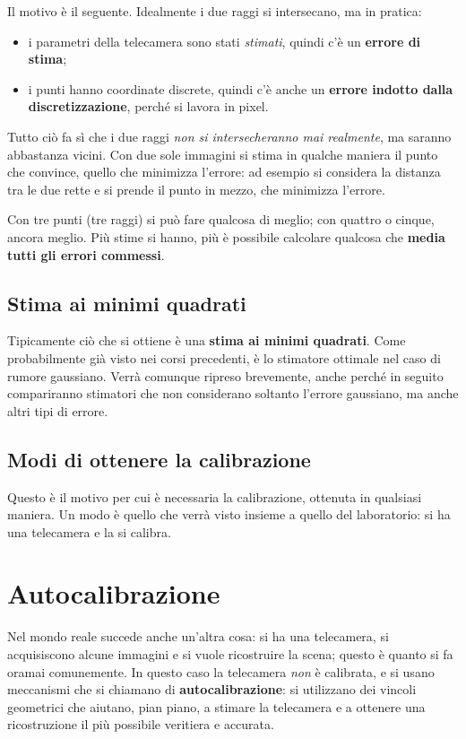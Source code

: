 Il motivo è il seguente. Idealmente i due raggi si intersecano, ma in pratica:
\begin{itemize}
  \item i parametri della telecamera sono stati \emph{stimati}, quindi c'è un \textbf{errore di stima};
  \item i punti hanno coordinate discrete, quindi c'è anche un \textbf{errore indotto dalla discretizzazione}, perché si lavora in pixel.
\end{itemize}
Tutto ciò fa sì che i due raggi \emph{non si intersecheranno mai realmente}, ma saranno abbastanza vicini. Con due sole immagini si stima in qualche maniera il punto che convince, quello che minimizza l'errore: ad esempio si considera la distanza tra le due rette e si prende il punto in mezzo, che minimizza l'errore.

Con tre punti (tre raggi) si può fare qualcosa di meglio; con quattro o cinque, ancora meglio. Più stime si hanno, più è possibile calcolare qualcosa che \textbf{media tutti gli errori commessi}.

\subsection{Stima ai minimi quadrati}

Tipicamente ciò che si ottiene è una \textbf{stima ai minimi quadrati}. Come probabilmente già visto nei corsi precedenti, è lo stimatore ottimale nel caso di rumore gaussiano. Verrà comunque ripreso brevemente, anche perché in seguito compariranno stimatori che non considerano soltanto l'errore gaussiano, ma anche altri tipi di errore.

\subsection{Modi di ottenere la calibrazione}

Questo è il motivo per cui è necessaria la calibrazione, ottenuta in qualsiasi maniera. Un modo è quello che verrà visto insieme a quello del laboratorio: si ha una telecamera e la si calibra.

\section{Autocalibrazione}

Nel mondo reale succede anche un'altra cosa: si ha una telecamera, si acquisiscono alcune immagini e si vuole ricostruire la scena; questo è quanto si fa oramai comunemente. In questo caso la telecamera \emph{non} è calibrata, e si usano meccanismi che si chiamano di \textbf{autocalibrazione}: si utilizzano dei vincoli geometrici che aiutano, pian piano, a stimare la telecamera e a ottenere una ricostruzione il più possibile veritiera e accurata.

